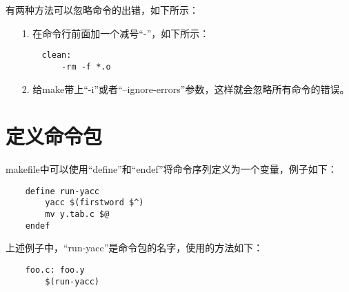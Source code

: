 \documentclass[a4paper,left=2.5cm,right=2.5cm,11pt]{article}
\begin{document}
	有两种方法可以忽略命令的出错，如下所示：
	\begin{itemize}
		\item[1.] 在命令行前面加一个减号“-”，如下所示：
		\begin{lstlisting}
	clean:
		-rm -f *.o
		\end{lstlisting}

		\item[2.] 给make带上“-i”或者“--ignore-errors”参数，这样就会忽略所有命令的错误。
	\end{itemize}

\section{定义命令包}
	makefile中可以使用“define”和“endef”将命令序列定义为一个变量，例子如下：
	\begin{lstlisting}
	define run-yacc
		yacc $(firstword $^)
		mv y.tab.c $@
	endef
	\end{lstlisting}

	上述例子中，“run-yacc”是命令包的名字，使用的方法如下：
	\begin{lstlisting}
	foo.c: foo.y
		$(run-yacc)
	\end{lstlisting}
	
\end{document}
